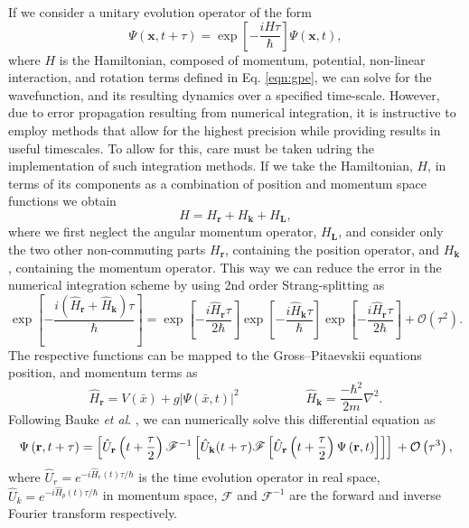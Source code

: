 If we consider a unitary evolution operator of the form
\begin{equation}\label{eqn:1}
\Psi(\mathbf{x},t+\tau) = \exp\left[ -\frac{iH\tau}{\hbar}\right]\Psi(\mathbf{x},t),
\end{equation}
where $H$ is the Hamiltonian, composed of momentum, potential, non-linear interaction, and rotation terms defined in Eq. \eqref{eqn:gpe}, we can solve for the wavefunction, and its resulting dynamics over a specified time-scale. However, due to error propagation resulting from numerical integration, it is instructive to employ methods that allow for the highest precision while providing results in useful timescales. To allow for this, care must be taken udring the implementation of such integration methods.  If we take the Hamiltonian, $H$, in terms of its components as a combination of position and momentum space functions we obtain
\begin{equation}\label{eqn:2}
{H} = {H}_{\textbf{r}} + {H}_{\textbf{k}} + {H}_{\textbf{L}},
\end{equation}
where we first neglect the angular momentum operator, ${H}_{\textbf{L}}$, and consider only the two other non-commuting parts ${H}_{\textbf{r}}$, containing the position operator, and ${H}_{\textbf{k}}$, containing the momentum operator. This way we can reduce the error in the numerical integration scheme by using 2nd order Strang-splitting as
\begin{equation}\label{eqn:3}
\exp\left[ -\frac{ i\left(\hat{H}_{\textbf{r}} + \hat{H}_{\textbf{k}}\right)\tau}{\hbar} \right] = \exp\left[- \frac{i\hat{H}_{\textbf{r}}\tau}{2\hbar} \right]\exp\left[-\frac{i\hat{H}_{\textbf{k}}\tau}{\hbar}\right]\exp\left[ -\frac{i\hat{H}_{\textbf{r}}\tau}{2\hbar}\right] + \mathcal{O}\left(\tau^2\right).
\end{equation}
The respective functions can be mapped to the Gross--Pitaevskii equations position, and momentum terms as
\begin{equation}
\hat{H}_{\textbf{r}} = V(\bar{x}) + g\vert\Psi(\bar{x},t)\vert^2\; \hspace{5em} \hat{H}_{\textbf{k}} = \frac{-\hbar^2}{2m}\nabla^2.
\end{equation}
Following Bauke \textit{et al}. \cite{Num:Bauke_cpc_2011}, we can numerically solve this differential equation as
\begin{equation}
\Psi\left(\textbf{r},t+\tau\right) = \left[\hat{U}_{\mathbf{r}}\left(t+\frac{\tau}{2}\right) \mathscr{F}^{-1} \left[ \hat{U}_{\mathbf{k}}(t+\tau) \mathscr{F} \left[ \hat{U}_{\mathbf{r}}\left(t+\frac{\tau}{2}\right) \Psi\left(\mathbf{r},t\right) \right] \right] \right]  \\ + \mathcal{O}\left(\tau^3\right),
\end{equation}
where $\hat{U}_{r}=e^{-i\hat{H}_{r}(t)\tau/\hbar}$ is the time evolution operator in real space, $\hat{U}_{k}=e^{-i\hat{H}_{p}(t)\tau/\hbar}$ in momentum space,  $\mathscr{F}$ and $\mathscr{F}^{-1}$ are the forward and inverse Fourier transform respectively.

